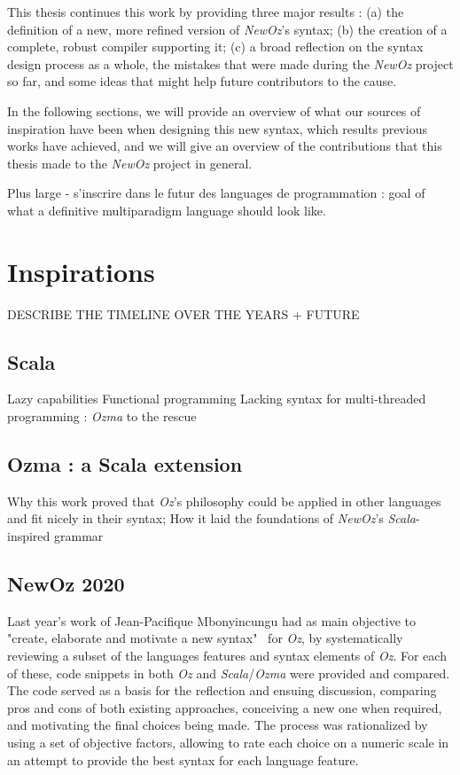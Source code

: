 This thesis continues this work by providing three major results :
(a) the definition of a new, more refined version of \textit{NewOz}'s syntax;
(b) the creation of a complete, robust compiler supporting it;
(c) a broad reflection on the syntax design process as a whole, the mistakes that were made during the \textit{NewOz} project so far, and some ideas that might help future contributors to the cause.\newline

In the following sections, we will provide an overview of what our sources of inspiration have been when designing this new syntax, which results previous works have achieved, and we will give an overview of the contributions that this thesis made to the \textit{NewOz} project in general.

Plus large - s'inscrire dans le futur des languages de programmation : goal of what a definitive multiparadigm language should look like.
\section{Inspirations}\label{sec:ch1-inspirations}

DESCRIBE THE TIMELINE OVER THE YEARS + FUTURE

\subsection{Scala}\label{subsec:ch1-scala}
Lazy capabilities\newline
Functional programming\newline
\newline
Lacking syntax for multi-threaded programming : \textit{Ozma} to the rescue

\subsection{Ozma : a Scala extension}\label{subsec:ch1-ozma}
Why this work proved that \textit{Oz}'s philosophy could be applied in other languages and fit nicely in their syntax;
How it laid the foundations of \textit{NewOz}'s \textit{Scala}-inspired grammar

\subsection{NewOz 2020}\label{subsec:ch1-newoz2020}
Last year's work of Jean-Pacifique Mbonyincungu had as main objective to "create, elaborate and motivate a new syntax"~\cite{jpthesis} for \textit{Oz}, by systematically reviewing a subset of the languages features and syntax elements of \textit{Oz}.
For each of these, code snippets in both \textit{Oz} and \textit{Scala}/\textit{Ozma} were provided and compared.
The code served as a basis for the reflection and ensuing discussion, comparing pros and cons of both existing approaches, conceiving a new one when required, and motivating the final choices being made.
The process was rationalized by using a set of objective factors, allowing to rate each choice on a numeric scale in an attempt to provide the best syntax for each language feature.\newline

